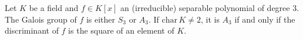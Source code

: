 Let $K$ be a field and $f \in K[x]$ an (irreducible) separable polynomial of degree $3$. The Galois group of $f$ is either $S_3$ or $A_3$. If $\mathrm{char}\,K \neq 2$, it is $A_3$ if and only if the discriminant of $f$ is the square of an element of $K$.
